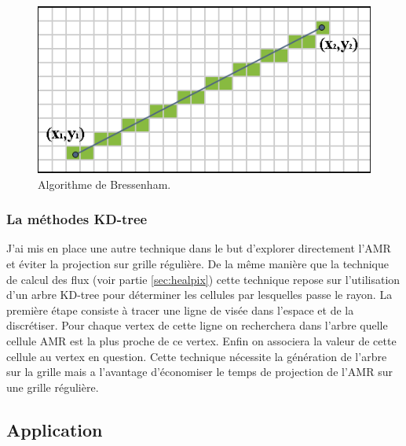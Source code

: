 \begin{figure}
        \includegraphics[width=.95\linewidth]{img/04/Bresenham_line.png} 
        \caption[Algorithme de Bressenham]{Algorithme de Bressenham.}
 		\label{fig:bressenham}
\end{figure}

\subsubsection{La méthodes KD-tree}

J'ai mis en place une autre technique dans le but d'explorer directement l'\ac{AMR} et éviter la projection sur grille régulière.
De la même manière que la technique de calcul des flux (voir partie \ref{sec:healpix}) cette technique repose sur l'utilisation d'un arbre KD-tree pour déterminer les cellules par lesquelles passe le rayon.
La première étape consiste à tracer une ligne de visée dans l'espace et de la discrétiser.
Pour chaque vertex de cette ligne on recherchera dans l'arbre quelle cellule \ac{AMR} est la plus proche de ce vertex.
Enfin on associera la valeur de cette cellule au vertex en question.
Cette technique nécessite la génération de l'arbre sur la grille mais a l'avantage d'économiser le temps de projection de l'\ac{AMR} sur une grille régulière.

\subsection{Application}


